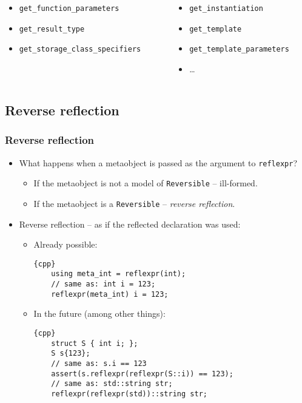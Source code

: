 \documentclass[compress,table,xcolor=table]{beamer}
\begin{document}
\begin{frame}
\begin{columns}
\begin{column}{0.45\textwidth}
\begin{itemize}
      \item \texttt{get\_function\_parameters}
      \item \texttt{get\_result\_type}
      \item \texttt{get\_storage\_class\_specifiers}
      \end{itemize}
    \end{column}
    \begin{column}{0.40\textwidth}
      \begin{itemize}
      \item \texttt{get\_instantiation}
      \item \texttt{get\_template}
      \item \texttt{get\_template\_parameters}
      \item \ldots
      \end{itemize}
    \end{column}
  \end{columns}
\end{frame}

\subsection{Reverse reflection}
\begin{frame}[fragile]
\frametitle{Reverse reflection}
  \small
  \begin{itemize}
    \item What happens when a metaobject is passed as the argument
      to \texttt{reflexpr}?
    \begin{itemize}
      \item If the metaobject is not a model of \texttt{Reversible} -- ill-formed.
      \item If the metaobject is a \texttt{Reversible} -- {\em reverse reflection}.
    \end{itemize}
    \item Reverse reflection -- as if the reflected declaration was used:
    \begin{itemize}
      \item Already possible:
      \begin{lstlisting}{cpp}
	using meta_int = reflexpr(int);
	// same as: int i = 123;
	reflexpr(meta_int) i = 123;
      \end{lstlisting}
      \item In the future (among other things):
      \begin{lstlisting}{cpp}
	struct S { int i; };
	S s{123};
	// same as: s.i == 123
	assert(s.reflexpr(reflexpr(S::i)) == 123);
	// same as: std::string str;
	reflexpr(reflexpr(std))::string str;
      \end{lstlisting}
    \end{itemize}
  \end{itemize}
\end{frame}
\end{document}

